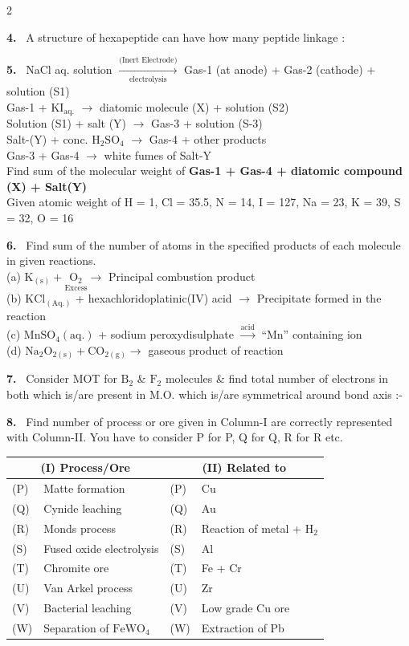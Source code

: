 \documentclass[10pt]{extarticle}
\newcommand{\qn}[1]{\par\smallskip\noindent\textbf{#1.}~}
\begin{document}
\begin{multicols}{2}
\qn{4} A structure of hexapeptide can have how many peptide linkage :

\qn{5} NaCl aq. solution $\xrightarrow[\text{electrolysis}]{\text{(Inert Electrode)}}$ Gas-1 (at anode) + Gas-2 (cathode) + solution (S1)\\
Gas-1 + KI$_{\text{aq.}}$ $\longrightarrow$ diatomic molecule (X) + solution (S2)\\
Solution (S1) + salt (Y) $\longrightarrow$ Gas-3 + solution (S-3)\\
Salt-(Y) + conc. $\mathrm{H_2SO_4}$ $\longrightarrow$ Gas-4 + other products\\
Gas-3 + Gas-4 $\longrightarrow$ white fumes of Salt-Y\\
Find sum of the molecular weight of \textbf{Gas-1 + Gas-4 + diatomic compound (X) + Salt(Y)}\\
Given atomic weight of H = 1, Cl = 35.5, N = 14, I = 127, Na = 23, K = 39, S = 32, O = 16

\qn{6} Find sum of the number of atoms in the specified products of each molecule in given reactions.\\
(a) $\mathrm{K_{(s)}}+\underset{\text{Excess}}{\mathrm{O_2}}\longrightarrow$ Principal combustion product\\
(b) $\mathrm{KCl_{(Aq.)}}$ + hexachloridoplatinic(IV) acid $\longrightarrow$ Precipitate formed in the reaction\\
(c) $\mathrm{MnSO_4(aq.)}$ + sodium peroxydisulphate $\xrightarrow{\text{acid}}$ ``Mn'' containing ion\\
(d) $\mathrm{Na_2O_{2(s)}}+\mathrm{CO_{2(g)}}\longrightarrow$ gaseous product of reaction

\qn{7} Consider MOT for $\mathrm{B_2}$ \& $\mathrm{F_2}$ molecules \& find total number of electrons in both which is/are present in M.O. which is/are symmetrical around bond axis :-

\qn{8} Find number of process or ore given in Column-I are correctly represented with Column-II. You have to consider P for P, Q for Q, R for R etc.
\begin{center}\footnotesize
\begin{tabular}{|p{0.65cm}|p{2.5cm}|p{0.65cm}|p{2.5cm}|}
\hline
\multicolumn{2}{|c|}{(I) Process/Ore} & \multicolumn{2}{c|}{(II) Related to}\\ \hline
(P) & Matte formation & (P) & Cu\\ \hline
(Q) & Cynide leaching & (Q) & Au\\ \hline
(R) & Monds process & (R) & Reaction of metal + $\mathrm{H_2}$\\ \hline
(S) & Fused oxide electrolysis & (S) & Al\\ \hline
(T) & Chromite ore & (T) & Fe + Cr\\ \hline
(U) & Van Arkel process & (U) & Zr\\ \hline
(V) & Bacterial leaching & (V) & Low grade Cu ore\\ \hline
(W) & Separation of $\mathrm{FeWO_4}$ & (W) & Extraction of Pb\\ \hline
\end{tabular}
\end{center}


\end{multicols}
\end{document}
